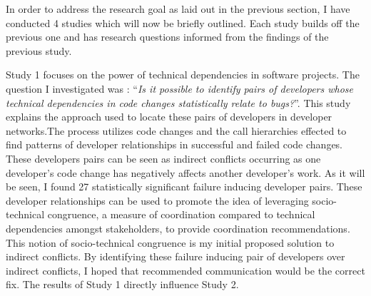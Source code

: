 In order to address the research goal as laid out in the previous section, I have conducted 4 studies which will
now be briefly outlined. Each study builds off the previous one and has research questions informed from the
findings of the previous study.

Study 1 focuses on the power of technical dependencies in software projects. The question I
investigated was : ``\textit{Is it possible to identify pairs of developers whose technical dependencies in 
code changes statistically relate to bugs?}''. This study explains the approach used to locate these pairs of developers 
in developer networks.The process utilizes code changes and the call hierarchies effected to find patterns of developer 
relationships in successful and failed code changes. These developers pairs can be seen as indirect conflicts occurring
as one developer's code change has negatively affects another developer's work. As it will be seen, I found 27 statistically significant failure 
inducing developer pairs. These developer relationships can be used to promote the idea of leveraging socio-technical 
congruence, a measure of coordination compared to technical dependencies amongst stakeholders, to provide coordination recommendations.
This notion of socio-technical congruence is my initial proposed solution to indirect conflicts. By identifying these failure
inducing pair of developers over indirect conflicts, I hoped that recommended communication would be the correct fix. The 
results of Study 1 directly influence Study 2.

